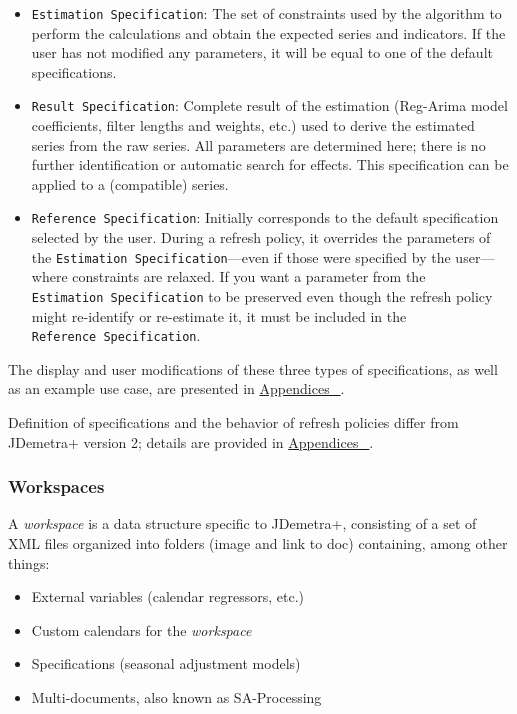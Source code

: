 \documentclass[
  letterpaper,
  DIV=11,
  numbers=noendperiod]{scrreprt}
\providecommand{\tightlist}{%
  \setlength{\itemsep}{0pt}\setlength{\parskip}{0pt}}\usepackage{longtable,booktabs,array}
\begin{document}
\begin{itemize}
\item
  \texttt{Estimation\ Specification}: The set of constraints used by the
  algorithm to perform the calculations and obtain the expected series
  and indicators. If the user has not modified any parameters, it will
  be equal to one of the default specifications.
\item
  \texttt{Result\ Specification}: Complete result of the estimation
  (Reg-Arima model coefficients, filter lengths and weights, etc.) used
  to derive the estimated series from the raw series. All parameters are
  determined here; there is no further identification or automatic
  search for effects. This specification can be applied to a
  (compatible) series.
\item
  \texttt{Reference\ Specification}: Initially corresponds to the
  default specification selected by the user. During a refresh policy,
  it overrides the parameters of the
  \texttt{Estimation\ Specification}---even if those were specified by
  the user---where constraints are relaxed. If you want a parameter from
  the \texttt{Estimation\ Specification} to be preserved even though the
  refresh policy might re-identify or re-estimate it, it must be
  included in the \texttt{Reference\ Specification}.
\end{itemize}

The display and user modifications of these three types of
specifications, as well as an example use case, are presented in
\protect\hyperlink{comp-specs}{Appendices~🔗}.

Definition of specifications and the behavior of refresh policies differ
from JDemetra+ version 2; details are provided in
\protect\hyperlink{spec-v2-v3}{Appendices~🔗}.

\hypertarget{sec-concept-workspace}{%
\subsubsection*{Workspaces}\label{sec-concept-workspace}}

A \emph{workspace} is a data structure specific to JDemetra+, consisting
of a set of XML files organized into folders (image and link to doc)
containing, among other things:

\begin{itemize}
\tightlist
\item
  External variables (calendar regressors, etc.)
\item
  Custom calendars for the \emph{workspace}
\item
  Specifications (seasonal adjustment models)
\item
  Multi-documents, also known as SA-Processing
\end{itemize}
\end{document}
